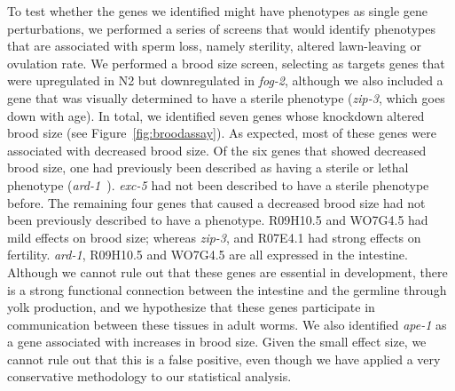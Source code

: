 \documentclass[9pt,twocolumn,twoside]{gsag3jnl}
\newcommand{\fog}{\emph{fog-2}}
\begin{document}
To test whether the genes we identified might have phenotypes as single gene perturbations, we performed a series of screens that would identify phenotypes that are associated with sperm loss, namely sterility, altered lawn-leaving or ovulation rate.
We performed a brood size screen, selecting as targets genes that were upregulated in N2 but downregulated in \fog{}, although we also included a gene that was visually determined to have a sterile phenotype (\emph{zip-3}, which goes down with age). In total, we identified seven genes whose knockdown altered brood size (see Figure~\ref{fig:broodassay}). As expected, most of these genes were associated with decreased brood size. Of the six genes that showed decreased brood size, one had previously been described as having a sterile or lethal phenotype (\emph{ard-1}~\citep{Simmer2003}). \emph{exc-5} had not been described to have a sterile phenotype before. The remaining four genes that caused a decreased brood size had not been previously described to have a phenotype. R09H10.5 and WO7G4.5 had mild effects on brood size; whereas \emph{zip-3}, and R07E4.1 had strong effects on fertility. \emph{ard-1}, R09H10.5 and WO7G4.5 are all expressed in the intestine.
Although we cannot rule out that these genes are essential in development, there is a strong functional connection between the intestine and the germline through yolk production\citep{DePina2011}, and we hypothesize that these genes participate in communication between these tissues in adult worms.
We also identified \emph{ape-1} as a gene associated with increases in brood size. Given the small effect size, we cannot rule out that this is a false positive, even though we have applied a very conservative methodology to our statistical analysis.
\end{document}
